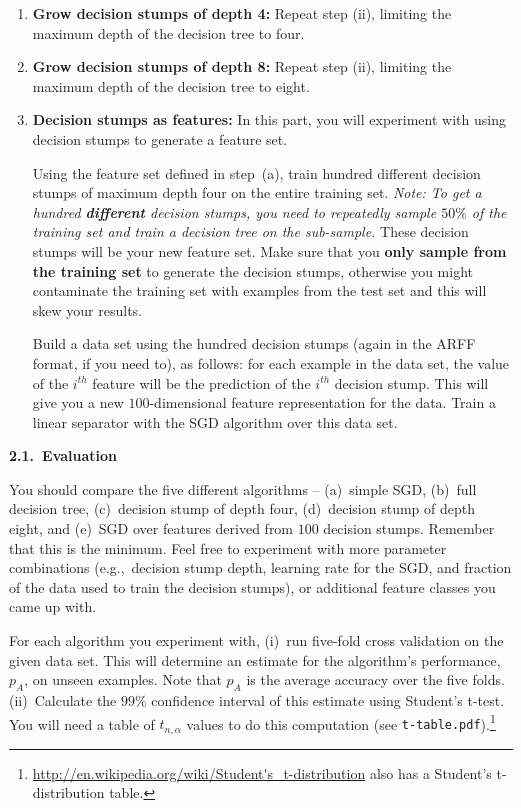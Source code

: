 \begin{enumerate}
\begin{enumerate}
\begin{enumerate}
  \item {\bf Grow decision stumps of depth 4:} Repeat step (ii), limiting the maximum
depth of the decision tree to four.

  \item {\bf Grow decision stumps of depth 8:} Repeat step (ii), limiting the maximum
depth of the decision tree to eight.

  \item {\bf Decision stumps as features:} In this part, you will
    experiment with using decision stumps to generate a feature set.

    Using the feature set defined in step~(a), train hundred different
    decision stumps of maximum depth four on the entire training
    set. {\em Note: To get a hundred {\bf different} decision stumps,
      you need to repeatedly sample $50\%$ of the training set and train
      a decision tree on the sub-sample.} These decision stumps will
    be your new feature set.  Make sure that you \textbf{only sample from the
    training set} to generate the decision stumps, otherwise you might
    contaminate the training set with examples from the test set and
    this will skew your results.

    Build a data set using the hundred decision stumps
  (again in the ARFF format, if you need to), as follows: 
  for each example in the data set, the value of the $i^{th}$ feature
    will be the prediction of the $i^{th}$ decision stump.  This will
    give you a new $100$-dimensional feature representation for the data. 
  Train a linear separator with the SGD algorithm over this data set.
    \end{enumerate}
  \end{enumerate}

\textbf{2.1.~Evaluation}

You should compare the five different algorithms -- (a)~simple SGD, (b)~full
decision tree, (c)~decision stump of depth four, (d)~decision stump of depth eight, and
(e)~SGD over features derived from $100$ decision stumps.  Remember that this is the minimum. Feel free to
experiment with more parameter combinations (e.g.,~decision stump depth,
learning rate for the SGD, and fraction of the data used to train the
decision stumps), or additional feature classes you came up with.

For each algorithm you experiment with, (i)~run five-fold cross validation on
the given data set.  This will determine an estimate for the
algorithm's performance, $p_A$, on unseen examples. Note that $p_A$ is the
average accuracy over the five folds. (ii)~Calculate the $99\%$ confidence
interval of this estimate using Student's t-test.
You will need a table of $t_{n, \alpha}$ values to do this computation
(see {\tt t-table.pdf}).\footnote{
\url{http://en.wikipedia.org/wiki/Student's_t-distribution} also has a Student's
t-distribution table.} 


\end{enumerate}
